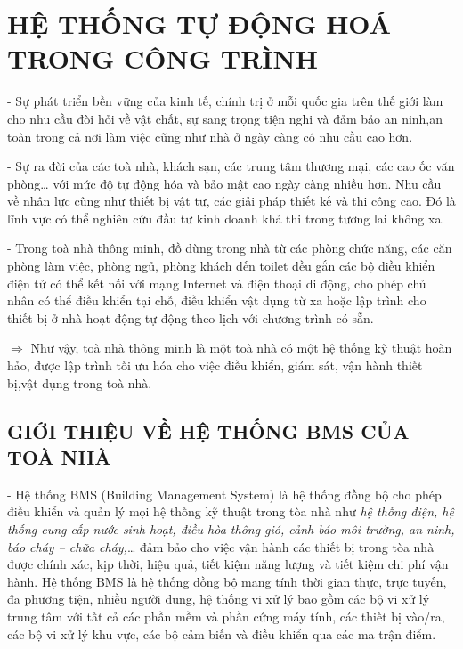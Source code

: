 	\section{HỆ THỐNG TỰ ĐỘNG HOÁ TRONG CÔNG TRÌNH}
	- Sự phát triển bền vững của kinh tế, chính trị ở mỗi quốc gia trên thế giới làm cho nhu cầu đòi hỏi về vật chất, sự sang trọng tiện nghi và đảm bảo an ninh,an toàn trong cả nơi làm việc cũng như nhà ở ngày càng có nhu cầu cao hơn.

	- Sự ra đời của các toà nhà, khách sạn, các trung tâm thương mại, các cao ốc văn phòng… với mức độ tự động hóa và bảo mật cao ngày càng nhiều hơn. Nhu cầu về nhân lực cũng như thiết bị vật tư, các giải pháp thiết kế và thi công cao. Đó là lĩnh vực có thể nghiên cứu đầu tư kinh doanh khả thi trong tương lai không xa.
	
	- Trong toà nhà thông minh, đồ dùng trong nhà từ các phòng chức năng, các căn phòng làm việc, phòng ngủ, phòng khách đến toilet đều gắn các bộ điều khiển điện tử có thể kết nối với mạng Internet và điện thoại di động, cho phép chủ nhân có thể điều khiển tại chỗ, điều khiển vật dụng từ xa hoặc lập trình cho thiết bị ở nhà hoạt động tự động theo lịch với chương trình có sẵn.
	
	$\pmb{\Rightarrow}$ Như vậy, toà nhà thông minh là một toà nhà có một hệ thống kỹ thuật hoàn hảo, được lập trình tối ưu hóa cho việc điều khiển, giám sát, vận hành thiết bị,vật dụng trong toà nhà.	
	\subsection{GIỚI THIỆU VỀ HỆ THỐNG BMS CỦA TOÀ NHÀ}
	- Hệ thống BMS (Building Management System) là hệ thống đồng bộ cho phép điều khiển và quản lý mọi hệ thống kỹ thuật trong tòa nhà như \emph{hệ thống điện, hệ thống cung cấp nước sinh hoạt, điều hòa thông gió, cảnh báo môi trường, an ninh, báo cháy – chữa cháy,}… đảm bảo cho việc vận hành các thiết bị trong tòa nhà được chính xác, kịp thời, hiệu quả, tiết kiệm năng lượng và tiết kiệm chi phí vận hành. Hệ thống BMS là hệ thống đồng bộ mang tính thời gian thực, trực tuyến, đa phương tiện, nhiều người dung, hệ thống vi xử lý bao gồm các bộ vi xử lý trung tâm với tất cả các phần mềm và phần cứng máy tính, các thiết bị vào/ra, các bộ vi xử lý khu vực, các bộ cảm biến và điều khiển qua các ma trận điểm.
	
